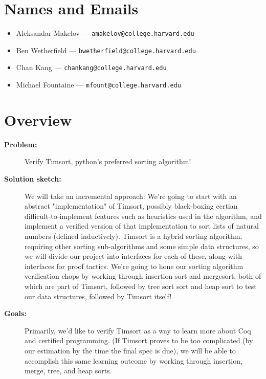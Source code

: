 \documentclass{article}
\begin{document}
\section{Names and Emails}
\begin{itemize}
  \item Aleksandar Makelov --- \texttt{amakelov@college.harvard.edu}
  \item Ben Wetherfield --- \texttt{bwetherfield@college.harvard.edu}
  \item Chan Kang --- \texttt{chankang@college.harvard.edu}
  \item Michael Fountaine --- \texttt{mfount@college.harvard.edu}
\end{itemize}

\section{Overview}
\begin{description}
  \item[\textbf{Problem:}]
    Verify Timsort, python's preferred sorting algorithm!
  \item[\textbf{Solution sketch:}]
    We will take an incremental approach:
    We're going to start with an abstract
    "implementation" of Timsort,
    possibly black-boxing certian difficult-to-implement features
    such as heuristics used in the algorithm,
    and implement a verified version of that implementation to sort
    lists of natural numbers (defined inductively).
    Timsort is a hybrid sorting
    algorithm, requiring other sorting sub-algorithms and some simple data
    structures, so we will divide our project into interfaces for each of
    these, along with interfaces for proof tactics.
    We're going to hone our sorting algorithm verification chops
    by working through insertion sort and mergesort, both of which
    are part of Timsort, followed by tree sort sort and heap sort
    to test our data structures, followed by Timsort itself!
  \item[\textbf{Goals:}]
    Primarily, we'd like to verify Timsort as a way to learn more about
    Coq and certified programming. (If Timsort proves to be too
    complicated (by our estimation by the time the final spec is due),
    we will be able to accomplish this same learning outcome by working
    through insertion, merge, tree, and heap sorts.
\end{description}

\end{document}
